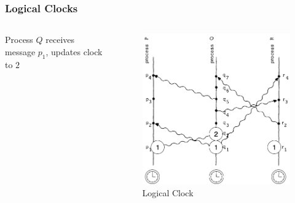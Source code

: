 \documentclass{beamer}
\begin{document}
\frame
{
	\frametitle{Logical Clocks}

	\begin{columns}
	\begin{column}{0.6\textwidth}

		Process $Q$ receives message $p_1$, updates clock to $2$


	\end{column}
	\begin{column}{0.4\textwidth}

		\begin{figure}[ht!]
		\includegraphics[width=\textwidth]{files/ClockDist-Impl-Logical-Clock-1.png}
		\caption{Logical Clock}
		\end{figure}


	\end{column}
	\end{columns}


}
\end{document}
